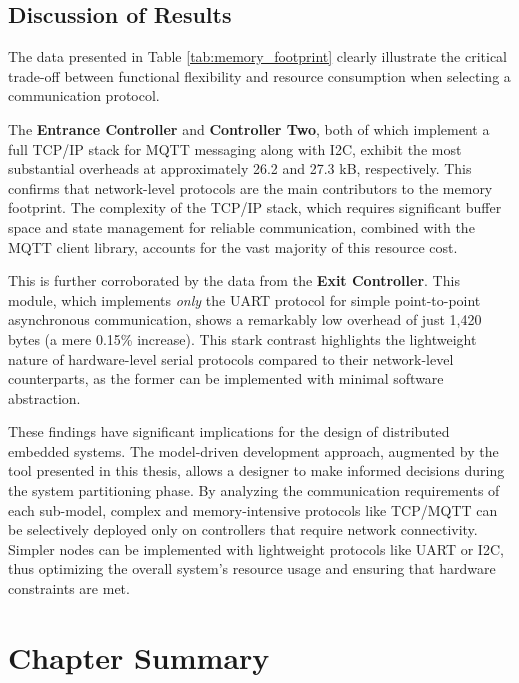 \subsection{Discussion of Results}
\label{subsec:analysis_discussion}

The data presented in Table \ref{tab:memory_footprint} clearly illustrate the critical trade-off between functional flexibility and resource consumption when selecting a communication protocol.

The \textbf{Entrance Controller} and \textbf{Controller Two}, both of which implement a full TCP/IP stack for MQTT messaging along with I2C, exhibit the most substantial overheads at approximately 26.2 and 27.3 kB, respectively. This confirms that network-level protocols are the main contributors to the memory footprint. The complexity of the TCP/IP stack, which requires significant buffer space and state management for reliable communication, combined with the MQTT client library, accounts for the vast majority of this resource cost.

This is further corroborated by the data from the \textbf{Exit Controller}. This module, which implements \textit{only} the UART protocol for simple point-to-point asynchronous communication, shows a remarkably low overhead of just 1,420 bytes (a mere 0.15\% increase). This stark contrast highlights the lightweight nature of hardware-level serial protocols compared to their network-level counterparts, as the former can be implemented with minimal software abstraction.

These findings have significant implications for the design of distributed embedded systems. The model-driven development approach, augmented by the tool presented in this thesis, allows a designer to make informed decisions during the system partitioning phase. By analyzing the communication requirements of each sub-model, complex and memory-intensive protocols like TCP/MQTT can be selectively deployed only on controllers that require network connectivity. Simpler nodes can be implemented with lightweight protocols like UART or I2C, thus optimizing the overall system's resource usage and ensuring that hardware constraints are met.

\section{Chapter Summary}
\label{sec:case_study_summary}

